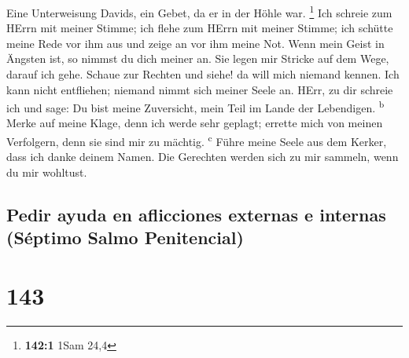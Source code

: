  Eine Unterweisung Davids, ein Gebet, da er in der Höhle
war. \footnote{\textbf{142:1} 1Sam 24,4}  Ich schreie zum
HErrn mit meiner Stimme; ich flehe zum HErrn mit meiner Stimme;
 ich schütte meine Rede vor ihm aus und zeige an vor ihm
meine Not.  Wenn mein Geist in Ängsten ist, so nimmst du
dich meiner an. Sie legen mir Stricke auf dem Wege, darauf ich gehe.
 Schaue zur Rechten und siehe! da will mich niemand
kennen. Ich kann nicht entfliehen; niemand nimmt sich meiner Seele an.
 HErr, zu dir schreie ich und sage: Du bist meine
Zuversicht, mein Teil im Lande der Lebendigen. \textsuperscript{b}
 Merke auf meine Klage, denn ich werde sehr geplagt;
errette mich von meinen Verfolgern, denn sie sind mir zu mächtig.
\textsuperscript{c}  Führe meine Seele aus dem Kerker,
dass ich danke deinem Namen. Die Gerechten werden sich zu mir sammeln,
wenn du mir wohltust.

\hypertarget{pedir-ayuda-en-aflicciones-externas-e-internas-suxe9ptimo-salmo-penitencial}{%
\subsection{Pedir ayuda en aflicciones externas e internas (Séptimo
Salmo
Penitencial)}\label{pedir-ayuda-en-aflicciones-externas-e-internas-suxe9ptimo-salmo-penitencial}}

\hypertarget{section-142}{%
\section{143}\label{section-142}}

